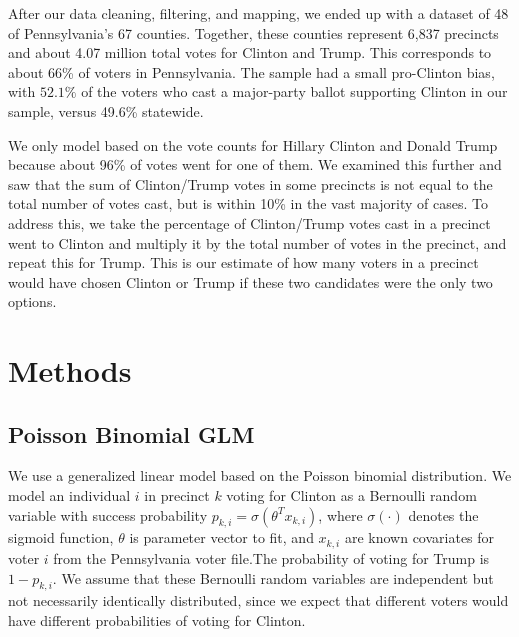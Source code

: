 \documentclass[10pt, letterpaper]{article}
\begin{document}
\begin{multicols}{2}
After our data cleaning, filtering, and mapping, we ended up with a dataset of 48 of Pennsylvania's 67 counties. Together, these counties represent 6,837 precincts and about 4.07 million total votes for Clinton and Trump. This corresponds to about 66\% of voters in Pennsylvania. The sample had a small pro-Clinton bias, with $52.1\%$ of the voters who cast a major-party ballot supporting Clinton in our sample, versus 49.6\% statewide. 

We only model based on the vote counts for Hillary Clinton and Donald Trump because about 96\% of votes went for one of them. We examined this further and saw that the sum of Clinton/Trump votes in some precincts is not equal to the total number of votes cast, but is within 10\% in the vast majority of cases. To address this, we take the percentage of Clinton/Trump votes cast in a precinct went to Clinton and multiply it by the total number of votes in the precinct, and repeat this for Trump. This is our estimate of how many voters in a precinct would have chosen Clinton or Trump if these two candidates were the only two options.

\section{Methods}

\subsection{Poisson Binomial GLM}

We use a generalized linear model based on the Poisson binomial distribution. We model an individual $i$ in precinct $k$ voting for Clinton as a Bernoulli random variable with success probability $p_{k, i} = \sigma(\theta^Tx_{k, i})$, where $\sigma(\cdot)$ denotes the sigmoid function, $\theta$ is parameter vector to fit, and $x_{k, i}$ are known covariates for voter $i$ from the Pennsylvania voter file.The probability of voting for Trump is $1 - p_{k, i}$. We assume that these Bernoulli random variables are independent but not necessarily identically distributed, since we expect that different voters would have different probabilities of voting for Clinton.


\end{multicols}
\end{document}
